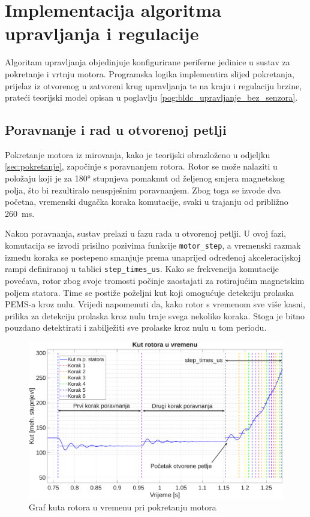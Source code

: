 \documentclass[diplomskirad]{fer}
\begin{document}
\section{Implementacija algoritma upravljanja i regulacije}
\label{sec:implementacija_algoritma_i_regulacije}

Algoritam upravljanja objedinjuje konfigurirane periferne jedinice u sustav za
pokretanje i vrtnju motora. Programska logika implementira slijed pokretanja,
prijelaz iz otvorenog u zatvoreni krug upravljanja te na kraju i regulaciju
brzine, prateći teorijski model opisan u poglavlju
\ref{pog:bldc_upravljanje_bez_senzora}.

\subsection{Poravnanje i rad u otvorenoj petlji}
\label{ssec:pokretanje_motora}

Pokretanje motora iz mirovanja, kako je teorijski obrazloženo u odjeljku
\ref{sec:pokretanje}, započinje s poravnanjem rotora. Rotor se može nalaziti u
položaju koji je za \ang{180} stupnjeva pomaknut od željenog smjera magnetskog
polja, što bi rezultiralo neuspješnim poravnanjem. Zbog toga se izvode dva
početna, vremenski dugačka koraka komutacije, svaki u trajanju od približno
\SI{260}{\milli\second}.

Nakon poravnanja, sustav prelazi u fazu rada u otvorenoj petlji. U ovoj fazi,
komutacija se izvodi prisilno pozivima funkcije \texttt{motor\_step}, a
vremenski razmak između koraka se postepeno smanjuje prema unaprijed određenoj
akceleracijskoj rampi definiranoj u tablici \texttt{step\_times\_us}. Kako se
frekvencija komutacije povećava, rotor zbog svoje tromosti počinje zaostajati
za rotirajućim magnetskim poljem statora. Time se postiže poželjni kut koji
omogućuje detekciju prolaska PEMS-a kroz nulu. Vrijedi napomenuti da, kako
rotor s vremenom sve više kasni, prilika za detekciju prolaska kroz nulu traje
svega nekoliko koraka. Stoga je bitno pouzdano detektirati i zabilježiti sve
prolaske kroz nulu u tom periodu.

\begin{figure}[h!]
	\centering
	\includegraphics[width=\textwidth]{csv/pokretanje.pdf}
	\caption{Graf kuta rotora u vremenu pri pokretanju motora}
	\label{fig:pokretanje}
\end{figure}
\end{document}

